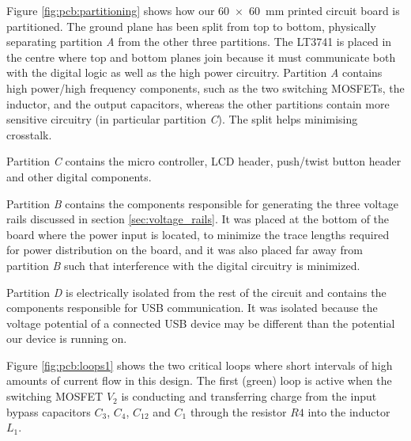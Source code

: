 \begin{minipage}{0.5\textwidth}
    Figure \ref{fig:pcb:partitioning}  shows how  our \SI{60x60}{\milli\meter}
    printed circuit board is partitioned. The ground plane has been split from
    top to  bottom, physically  separating partition  \emph{A} from  the other
    three partitions.  The LT3741 is placed in the centre where top and bottom
    planes join  because it must  communicate both  with the digital  logic as
    well  as  the  high  power  circuitry. Partition  \emph{A}  contains  high
    power/high frequency  components, such as  the two switching  MOSFETs, the
    inductor, and the output capacitors,  whereas the other partitions contain
    more  sensitive circuitry  (in particular  partition \emph{C}). The  split
    helps minimising crosstalk.

    Partition \emph{C}  contains the micro controller,  LCD header, push/twist
    button header and other digital components.

    Partition \emph{B} contains the  components responsible for generating the
    three voltage  rails discussed in section  \ref{sec:voltage_rails}. It was
    placed at  the bottom of  the board where the  power input is  located, to
    minimize the trace  lengths required for power distribution  on the board,
    and  it  was also  placed  far  away  from  partition \emph{B}  such  that
    interference with the digital circuitry is minimized.

    Partition \emph{D} is  electrically isolated from the rest  of the circuit
    and contains  the components  responsible for  USB communication.   It was
    isolated because  the voltage potential of  a connected USB device  may be
    different than the potential our device is running on.

    Figure  \ref{fig:pcb:loops1}  shows the  two  critical  loops where  short
    intervals  of high  amounts  of  current flow  in  this design. The  first
    (green) loop is  active when the switching MOSFET $V_2$  is conducting and
    transferring  charge  from  the  input  bypass  capacitors  $C_3$,  $C_4$,
    $C_{12}$ and $C_1$ through the resistor $R4$ into the inductor $L_1$.
\end{minipage}
